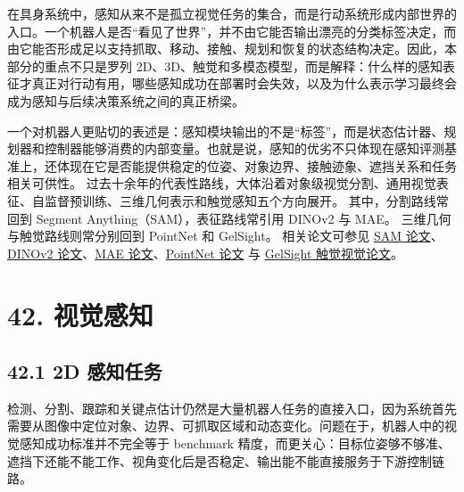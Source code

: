 

在具身系统中，感知从来不是孤立视觉任务的集合，而是行动系统形成内部世界的入口。一个机器人是否“看见了世界”，并不由它能否输出漂亮的分类标签决定，而由它能否形成足以支持抓取、移动、接触、规划和恢复的状态结构决定。因此，本部分的重点不只是罗列 2D、3D、触觉和多模态模型，而是解释：什么样的感知表征才真正对行动有用，哪些感知成功在部署时会失效，以及为什么表示学习最终会成为感知与后续决策系统之间的真正桥梁。

一个对机器人更贴切的表述是：感知模块输出的不是“标签”，而是状态估计器、规划器和控制器能够消费的内部变量。也就是说，感知的优劣不只体现在感知评测基准上，还体现在它是否能提供稳定的位姿、对象边界、接触迹象、遮挡关系和任务相关可供性。 过去十余年的代表性路线，大体沿着对象级视觉分割、通用视觉表征、自监督预训练、三维几何表示和触觉感知五个方向展开。 其中，分割路线常回到 Segment Anything（SAM），表征路线常引用 DINOv2 与 MAE。 三维几何与触觉路线则常分别回到 PointNet 和 GelSight。 相关论文可参见 \href{https://arxiv.org/abs/2304.02643}{SAM 论文}、\href{https://arxiv.org/abs/2304.07193}{DINOv2 论文}、\href{https://arxiv.org/abs/2111.06377}{MAE 论文}、\href{https://arxiv.org/abs/1612.00593}{PointNet 论文} 与 \href{https://arxiv.org/abs/1706.09942}{GelSight 触觉视觉论文}。

\section*{42. 视觉感知}

\subsection*{42.1 2D 感知任务}


检测、分割、跟踪和关键点估计仍然是大量机器人任务的直接入口，因为系统首先需要从图像中定位对象、边界、可抓取区域和动态变化。问题在于，机器人中的视觉感知成功标准并不完全等于 benchmark 精度，而更关心：目标位姿够不够准、遮挡下还能不能工作、视角变化后是否稳定、输出能不能直接服务于下游控制链路。

